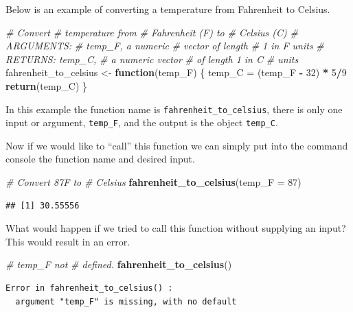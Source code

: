 \documentclass[
]{book}
\newenvironment{Shaded}{\begin{snugshade}}{\end{snugshade}}
\newcommand{\CommentTok}[1]{\textcolor[rgb]{0.56,0.35,0.01}{\textit{#1}}}
\newcommand{\ControlFlowTok}[1]{\textcolor[rgb]{0.13,0.29,0.53}{\textbf{#1}}}
\newcommand{\DataTypeTok}[1]{\textcolor[rgb]{0.13,0.29,0.53}{#1}}
\newcommand{\DecValTok}[1]{\textcolor[rgb]{0.00,0.00,0.81}{#1}}
\newcommand{\KeywordTok}[1]{\textcolor[rgb]{0.13,0.29,0.53}{\textbf{#1}}}
\newcommand{\NormalTok}[1]{#1}
\newcommand{\OperatorTok}[1]{\textcolor[rgb]{0.81,0.36,0.00}{\textbf{#1}}}
\newcommand{\StringTok}[1]{\textcolor[rgb]{0.31,0.60,0.02}{#1}}
\begin{document}
Below is an example of converting a temperature from Fahrenheit to Celsius.

\begin{Shaded}
\begin{Highlighting}[]
\CommentTok{# Convert}
\CommentTok{# temperature from}
\CommentTok{# Fahrenheit (F) to}
\CommentTok{# Celsius (C)}
\CommentTok{# ARGUMENTS:}
\CommentTok{# temp_F, a numeric}
\CommentTok{# vector of length}
\CommentTok{# 1 in F units}
\CommentTok{# RETURNS: temp_C,}
\CommentTok{# a numeric vector}
\CommentTok{# of length 1 in C}
\CommentTok{# units}
\NormalTok{fahrenheit_to_celsius <-}\StringTok{ }\ControlFlowTok{function}\NormalTok{(temp_F) \{}
\NormalTok{    temp_C =}\StringTok{ }\NormalTok{(temp_F }\OperatorTok{-}
\StringTok{        }\DecValTok{32}\NormalTok{) }\OperatorTok{*}\StringTok{ }\DecValTok{5}\OperatorTok{/}\DecValTok{9}
    \KeywordTok{return}\NormalTok{(temp_C)}
\NormalTok{\}}
\end{Highlighting}
\end{Shaded}

In this example the function name is \texttt{fahrenheit\_to\_celsius}, there is only one input or argument, \texttt{temp\_F}, and the output is the object \texttt{temp\_C}.

Now if we would like to ``call'' this function we can simply put into the command console the function name and desired input.

\begin{Shaded}
\begin{Highlighting}[]
\CommentTok{# Convert 87F to}
\CommentTok{# Celsius}
\KeywordTok{fahrenheit_to_celsius}\NormalTok{(}\DataTypeTok{temp_F =} \DecValTok{87}\NormalTok{)}
\end{Highlighting}
\end{Shaded}

\begin{verbatim}
## [1] 30.55556
\end{verbatim}

What would happen if we tried to call this function without supplying an input? This would result in an error.

\begin{Shaded}
\begin{Highlighting}[]
\CommentTok{# temp_F not}
\CommentTok{# defined.}
\KeywordTok{fahrenheit_to_celsius}\NormalTok{()}
\end{Highlighting}
\end{Shaded}

\begin{verbatim}
Error in fahrenheit_to_celsius() : 
  argument "temp_F" is missing, with no default
\end{verbatim}
\end{document}
